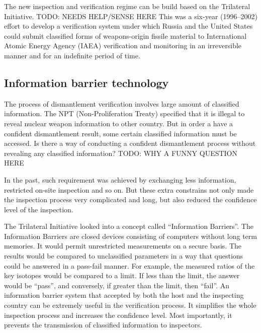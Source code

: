 \documentclass[twoside,titlepage,11pt,twocolumn,a4paper]{article}
\begin{document}
The new inspection and verification regime can be build based on the
Trilateral Initiative. \citep{zarimpas2003} TODO: NEEDS HELP/SENSE HERE This was a six-year
(1996--2002) effort to develop a verification system under which
Russia and the United States could submit classified forms of
weapons-origin fissile material to International Atomic Energy Agency
(IAEA) verification and monitoring in an irreversible manner and for
an indefinite period of time.

\subsection{Information barrier technology}
The process of dismantlement verification involves large amount of
classified information. The NPT (Non-Proliferation Treaty) specified
that it is illegal to reveal nuclear weapon information to other
country. But in order a have a confident dismantlement result, some
certain classified information must be accessed. Is there a way of
conducting a confident dismantlement process without revealing any
classified information? TODO: WHY A FUNNY QUESTION HERE

In the past, such requirement was achieved by exchanging less
information, restricted on-site inspection and so on. But these extra
constrains not only made the inspection process very complicated and
long, but also reduced the confidence level of the inspection.

The Trilateral Initiative looked into a concept called ``Information
Barriers''. The Information Barriers are closed devices consisting of
computers without long term memories. It would permit unrestricted
measurements on a secure basis. The results would be compared to
unclassified parameters in a way that questions could be answered in a
pass-fail manner. \citep{SUW2005} For example, the measured ratios of
the key isotopes would be compared to a limit. If less than the limit,
the answer would be ``pass'', and conversely, if greater than the
limit, then ``fail''. An information barrier system that accepted by
both the host and the inspecting country can be extremely useful in
the verification process. It simplifies the whole inspection process
and increases the confidence level. Most importantly, it prevents the
transmission of classified information to inspectors.

\end{document}
